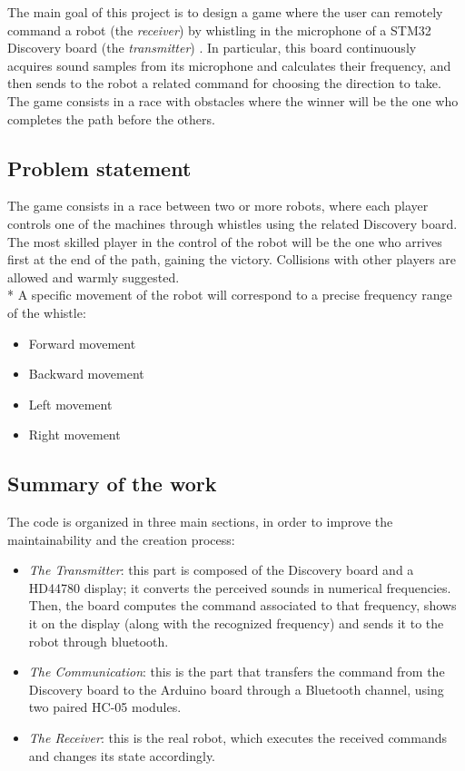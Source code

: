 The main goal of this project is to design a game where the user can remotely command a robot (the \textit{receiver}) by whistling in the microphone of a STM32 Discovery board (the \textit{transmitter}) . In particular, this board continuously acquires sound samples from its microphone and calculates their frequency, and then sends to the robot a related command for choosing the direction to take. The game consists in a race with obstacles where the winner will be the one who completes the path before the others.

\subsection{Problem statement}
The game consists in a race between two or more robots, where each player controls one of the machines through whistles using the related Discovery board. The most skilled player in the control of the robot will be the one who arrives first at the end of the path, gaining the victory. Collisions with other players are allowed and warmly suggested.\\*
A specific movement of the robot will correspond to a precise frequency range of the whistle:
\begin{itemize}
	\item Forward movement
	\item Backward movement
	\item Left movement
	\item Right movement
\end{itemize}

\subsection{Summary of the work}
The code is organized in three main sections, in order to improve the maintainability and the creation process:
\begin{itemize}
	\item \textit{The Transmitter}: this part is composed of the Discovery board and a HD44780 display; it converts the perceived sounds in numerical frequencies. Then, the board computes the command associated to that frequency, shows it on the display (along with the recognized frequency) and sends it to the robot through bluetooth.
	\item \textit{The Communication}: this is the part that transfers the command from the Discovery board to the Arduino board through a Bluetooth channel, using two paired HC-05 modules.
	\item \textit{The Receiver}: this is the real robot, which executes the received commands and changes its state accordingly.
\end{itemize}
